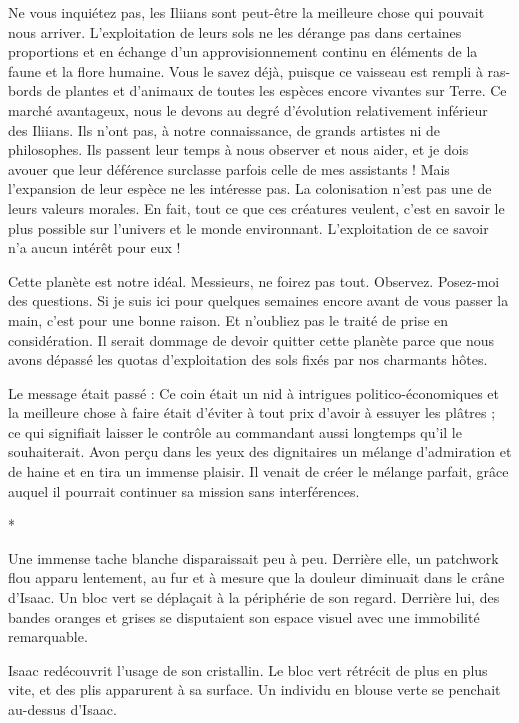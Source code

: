 \documentclass[12pt]{book}
\newcommand{\s}{\begin{center}
*
\end{center}
}
\begin{document}
Ne vous inquiétez pas, les Iliians sont peut-être la meilleure chose qui pouvait nous arriver. L'exploitation de leurs sols ne les dérange pas dans certaines proportions et en échange d'un approvisionnement continu en éléments de la faune et la flore humaine. Vous le savez déjà, puisque ce vaisseau est rempli à ras-bords de plantes et d'animaux de toutes les espèces encore vivantes sur Terre. Ce marché avantageux, nous le devons au degré d'évolution relativement inférieur des Iliians. Ils n'ont pas,  à notre connaissance, de grands artistes ni de philosophes. Ils passent leur temps à nous observer et nous aider, et je dois avouer que leur déférence surclasse parfois celle de mes assistants ! Mais l'expansion de leur espèce ne les intéresse pas. La colonisation n'est pas une de leurs valeurs morales. En fait, tout ce que ces créatures veulent, c'est en savoir le plus possible sur l'univers et le monde environnant. L'exploitation de ce savoir n'a aucun intérêt pour eux !


Cette planète est notre idéal. Messieurs, ne foirez pas tout. Observez. Posez-moi des questions. Si je suis ici pour quelques semaines encore avant de vous passer la main, c'est pour une bonne raison. Et n'oubliez pas le traité de prise en considération. Il serait dommage de devoir quitter cette planète parce que nous avons dépassé les quotas d'exploitation des sols fixés par nos charmants hôtes.


Le message était passé : Ce coin était un nid à intrigues politico-économiques et la meilleure chose à faire était d'éviter à tout prix d'avoir à essuyer les plâtres ; ce qui signifiait laisser le contrôle au commandant aussi longtemps qu'il le souhaiterait. Avon perçu dans les yeux des dignitaires un mélange d'admiration et de haine et en tira un immense plaisir. Il venait de créer le mélange parfait, grâce auquel il pourrait continuer sa mission sans interférences.

\s

Une immense tache blanche disparaissait peu à peu. Derrière elle, un patchwork flou apparu lentement, au fur et à mesure que la douleur diminuait dans le crâne d'Isaac. Un bloc vert se déplaçait à la périphérie de son regard. Derrière lui, des bandes oranges et grises se disputaient son espace visuel avec une immobilité remarquable.


Isaac redécouvrit l'usage de son cristallin. Le bloc vert rétrécit de plus en plus vite, et des plis apparurent à sa surface. Un individu en blouse verte se penchait au-dessus d'Isaac.
\end{document}
